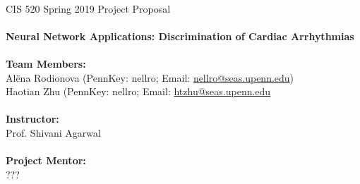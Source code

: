 \renewcommand{\headrulewidth}{0pt}
\renewcommand{\headrulewidth}{0pt}

\thispagestyle{fancy}
\mbox{}\vspace{1cm}\\
CIS 520 Spring 2019 Project Proposal\\
\\
{\Large \textbf{Neural Network Applications: Discrimination of 
Cardiac Arrhythmias}} 
\\
\vspace{5cm}\\
%
%
%
\textbf{Team Members:}\\
Al\"{e}na Rodionova (PennKey: nellro; 
Email: \href{mailto:nellro@seas.upenn.edu}{nellro@seas.upenn.edu}) \\
Haotian Zhu (PennKey: nellro; 
Email: \href{mailto:htzhu@seas.upenn.edu}{htzhu@seas.upenn.edu}\\
%
\vspace{1cm}\\
\textbf{Instructor:}\\
Prof. Shivani Agarwal\\
%
\vspace{1cm}\\
\textbf{Project Mentor:}\\
???

\newpage